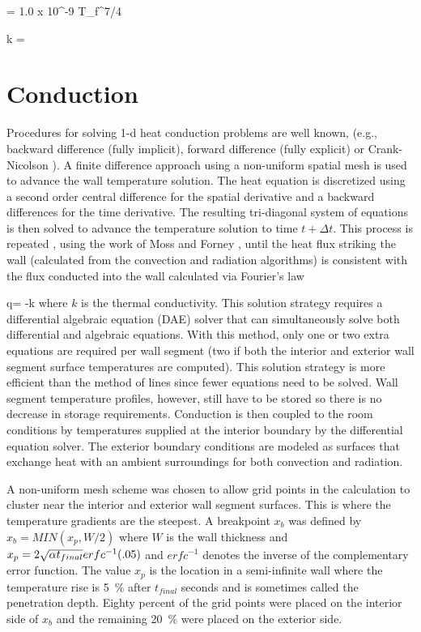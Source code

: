 \be \alpha = 1.0 x 10^{-9} T_f^{7/4} \ee

\be k =  \ee

 \section{Conduction}

 Procedures for solving 1-d heat conduction problems are well known, (e.g., backward difference (fully implicit), forward difference (fully explicit) or Crank-Nicolson \cite{Golub:1989}).  A finite difference approach  using a non-uniform spatial mesh is used to advance the wall temperature solution.  The heat equation is discretized using a second order central difference for the spatial derivative and a backward differences for the time derivative.  The resulting tri-diagonal system of equations is then solved to advance the temperature solution to time $t+\Delta t$.  This process is repeated , using the work of Moss and Forney \cite{Moss:1992},  until  the heat flux striking the wall (calculated from the convection and radiation algorithms) is consistent with the flux conducted into the wall calculated via Fourier's law

 \be q\dprime = -k  \ee
where $k$ is the thermal conductivity.  This solution strategy requires a differential algebraic equation (DAE) solver that can simultaneously solve both differential and algebraic equations.  With this method, only one or two extra equations are required per wall segment (two if both the interior and exterior wall segment surface temperatures are computed).  This solution strategy is more efficient than the method of lines since fewer equations need to be solved.  Wall segment temperature profiles, however, still have to be stored so there is no decrease in storage requirements.  Conduction is then coupled to the room conditions by temperatures supplied at the interior boundary by the differential equation solver.  The exterior boundary conditions are modeled as surfaces that exchange heat with an ambient surroundings for both convection and radiation.

A non-uniform mesh scheme was chosen to allow grid points in the calculation to cluster near the interior and exterior wall segment surfaces.  This is where the temperature gradients are the steepest.  A breakpoint  $x_b$ was defined by $x_b = MIN(x_p, W/2)$ where $W$ is the wall thickness and $x_p = 2 \sqrt{\alpha t_{final}} erfc^{-1} { \left( {.05} \right) }$ and $erfc^{-1}$ denotes the inverse of the complementary error function.  The value $x_p$ is the location in a semi-infinite wall where the temperature rise is 5~\% after $t_{final}$ seconds and is sometimes called the penetration depth.  Eighty percent of the grid points were placed on the interior side of $x_b$ and the remaining 20~\% were placed on the exterior side.

